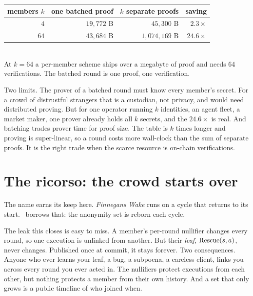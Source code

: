 \documentclass[11pt]{article}
\begin{document}
\begin{measured}
\centering
\begin{tabular}{rrrr}
\toprule
members $k$ & one batched proof & $k$ separate proofs & saving \\
\midrule
$4$  & $19{,}772$ B & $45{,}300$ B     & $2.3\times$ \\
$64$ & $43{,}684$ B & $1{,}074{,}169$ B & $24.6\times$ \\
\bottomrule
\end{tabular}\\[0.3em]
{\footnotesize At $k{=}64$ a per-member scheme ships over a megabyte of proof and needs
$64$ verifications. The batched round is one proof, one verification.}
\end{measured}

\begin{honest}
Two limits. The prover of a batched round must know every member's secret. For a crowd
of distrustful strangers that is a custodian, not privacy, and would need distributed
proving. But for one operator running $k$ identities, an agent fleet, a market maker,
one prover already holds all $k$ secrets, and the $24.6\times$ is real. And batching
trades prover time for proof size. The table is $k$ times longer and proving is
super-linear, so a round costs more wall-clock than the sum of separate proofs. It is
the right trade when the scarce resource is on-chain verifications.
\end{honest}

\section{The ricorso: the crowd starts over}
\label{sec:ricorso}

The name earns its keep here. \emph{Finnegans Wake} runs on a cycle that returns to its
start. \river\ borrows that: the anonymity set is reborn each cycle.

The leak this closes is easy to miss. A member's per-round nullifier changes every
round, so one execution is unlinked from another. But their \emph{leaf}, $\mathrm{Rescue}(s,a)$,
never changes. Published once at commit, it stays forever. Two consequences. Anyone who
ever learns your leaf, a bug, a subpoena, a careless client, links you across every
round you ever acted in. The nullifiers protect executions from each other, but nothing
protects a member from their own history. And a set that only grows is a public timeline
of who joined when.
\end{document}
